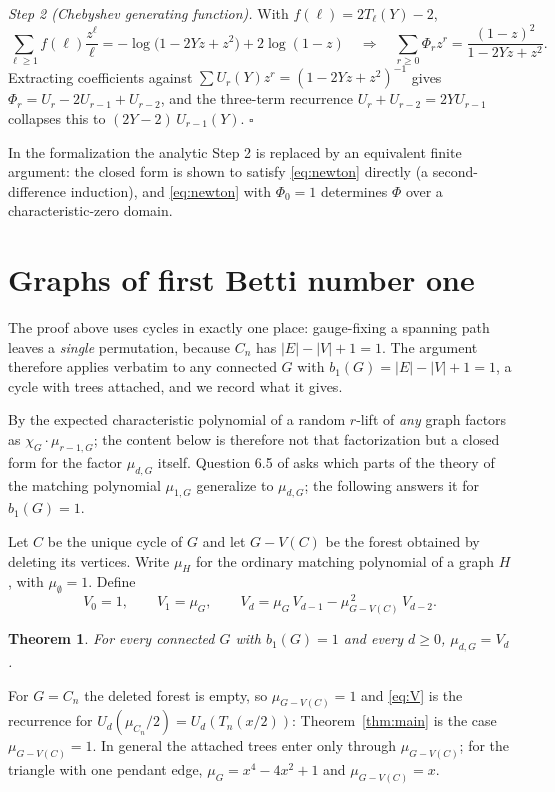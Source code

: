 \documentclass[11pt]{article}
\newtheorem{theorem}{Theorem}
\theoremstyle{remark}
\begin{document}
\emph{Step 2 (Chebyshev generating function).} With $f(\ell)=2T_\ell(Y)-2$,
\[
\sum_{\ell\ge1}f(\ell)\frac{z^\ell}{\ell}
=-\log\bigl(1-2Yz+z^2\bigr)+2\log(1-z)
\quad\Longrightarrow\quad
\sum_{r\ge0}\Phi_r z^r=\frac{(1-z)^2}{1-2Yz+z^2}.
\]
Extracting coefficients against $\sum U_r(Y)z^r=(1-2Yz+z^2)^{-1}$ gives
$\Phi_r=U_r-2U_{r-1}+U_{r-2}$, and the three-term recurrence
$U_r+U_{r-2}=2YU_{r-1}$ collapses this to $(2Y-2)\,U_{r-1}(Y)$.
\hfill$\square$

In the formalization the analytic Step 2 is replaced by an equivalent
finite argument: the closed form is shown to satisfy \eqref{eq:newton}
directly (a second-difference induction), and \eqref{eq:newton} with
$\Phi_0=1$ determines $\Phi$ over a characteristic-zero domain.

\section{Graphs of first Betti number one}\label{sec:uni}

The proof above uses cycles in exactly one place: gauge-fixing a spanning path
leaves a \emph{single} permutation, because $C_n$ has $|E|-|V|+1=1$. The
argument therefore applies verbatim to any connected $G$ with
$b_1(G)=|E|-|V|+1=1$, a cycle with trees attached, and we record what it gives.

By \cite{HPS} the expected characteristic polynomial of a random $r$-lift of
\emph{any} graph factors as $\chi_G\cdot\mu_{r-1,G}$; the content below is
therefore not that factorization but a closed form for the factor
$\mu_{d,G}$ itself. Question 6.5 of \cite{HPS} asks which parts of the theory
of the matching polynomial $\mu_{1,G}$ generalize to $\mu_{d,G}$; the following
answers it for $b_1(G)=1$.

Let $C$ be the unique cycle of $G$ and let $G-V(C)$ be the forest obtained by
deleting its vertices. Write $\mu_H$ for the ordinary matching polynomial of a
graph $H$, with $\mu_\emptyset=1$. Define
\begin{equation}\label{eq:V}
V_0=1,\qquad V_1=\mu_G,\qquad
V_d=\mu_G\,V_{d-1}-\mu_{G-V(C)}^{\,2}\,V_{d-2}.
\end{equation}

\begin{theorem}\label{thm:uni}
For every connected $G$ with $b_1(G)=1$ and every $d\ge0$, $\mu_{d,G}=V_d$.
\end{theorem}

For $G=C_n$ the deleted forest is empty, so $\mu_{G-V(C)}=1$ and \eqref{eq:V}
is the recurrence for $U_d(\mu_{C_n}/2)=U_d(T_n(x/2))$: Theorem~\ref{thm:main}
is the case $\mu_{G-V(C)}=1$. In general the attached trees enter only through
$\mu_{G-V(C)}$; for the triangle with one pendant edge,
$\mu_G=x^4-4x^2+1$ and $\mu_{G-V(C)}=x$.
\end{document}
